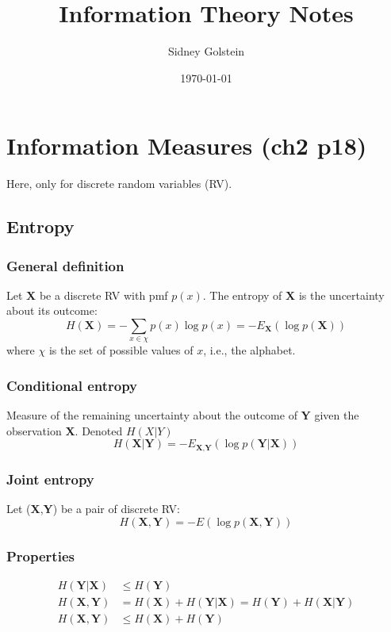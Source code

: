 \documentclass[11pt]{article}
\title{Information Theory Notes}
\author{Sidney Golstein}
\date{\today}
\begin{document}
\maketitle


\section{Information Measures (ch2 p18)}
Here, only for discrete random variables (RV).
\subsection{Entropy}
\subsubsection{General definition}
Let \textbf{X} be a discrete RV with pmf $p(x)$. The entropy of \textbf{X} is the uncertainty about its outcome:
\begin{equation}
    H(\textbf{X}) = -\sum_{x \in \chi } p(x) \log{p(x)} = -E_{\textbf{X}}\left(\log{p(\textbf{X})}\right)
\end{equation}
where $\chi$ is the set of possible values of $x$, i.e., the alphabet.

\subsubsection{Conditional entropy}
Measure of the remaining uncertainty about the outcome of \textbf{Y} given the observation \textbf{X}. Denoted $H(X|Y)$
\begin{equation}
    H(\textbf{X}|\textbf{Y})  = - E_{\textbf{X},\textbf{Y}} \left( \log{p(\textbf{Y}|\textbf{X})} \right)
\end{equation}

\subsubsection{Joint entropy}
Let (\textbf{X},\textbf{Y}) be a pair of discrete RV:
\begin{equation}
    H(\textbf{X},\textbf{Y}) = - E\left( \log{p(\textbf{X},\textbf{Y})} \right)
\end{equation}

\subsubsection{Properties}
\begin{align}
    H(\textbf{Y}|\textbf{X}) &\leq H(\textbf{Y}) \\
    H(\textbf{X},\textbf{Y}) &= H(\textbf{X}) + H(\textbf{Y}|\textbf{X}) =H(\textbf{Y}) + H(\textbf{X}|\textbf{Y}) \\
    H(\textbf{X},\textbf{Y}) &\leq H(\textbf{X}) + H(\textbf{Y})
\end{align}
\end{document}
